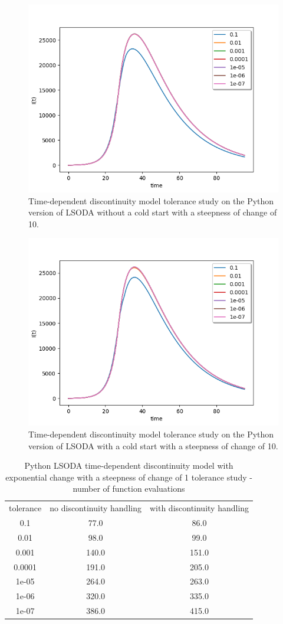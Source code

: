\begin{figure}[H]
\centering
\includegraphics[width=0.7\linewidth]{./figures/exp_time_tol_lsoda_no_event_10}
\caption{Time-dependent discontinuity model tolerance study on the Python version of LSODA without a cold start with a steepness of change of 10.}
\label{fig:exp_time_tol_lsoda_no_event_10}
\end{figure}

\begin{figure}[H]
\centering
\includegraphics[width=0.7\linewidth]{./figures/exp_time_tol_lsoda_event_10}
\caption{Time-dependent discontinuity model tolerance study on the Python version of LSODA with a cold start with a steepness of change of 10.}
\label{fig:exp_time_tol_lsoda_event_10}
\end{figure}

\begin{table}[H]
\caption {Python LSODA time-dependent discontinuity model with exponential change with a steepness of change of 1 tolerance study - number of function evaluations} \label{tab:exp_time_tol_lsoda_10} 
\begin{center}
\begin{tabular}{ c c c }
tolerance & no discontinuity handling & with discontinuity handling \\ 
0.1 & 77.0 & 86.0 \\
0.01 & 98.0 & 99.0 \\
0.001 & 140.0 & 151.0 \\
0.0001 & 191.0 & 205.0 \\
1e-05 & 264.0 & 263.0 \\
1e-06 & 320.0 & 335.0 \\
1e-07 & 386.0 & 415.0 \\
\end{tabular}
\end{center}
\end{table}


